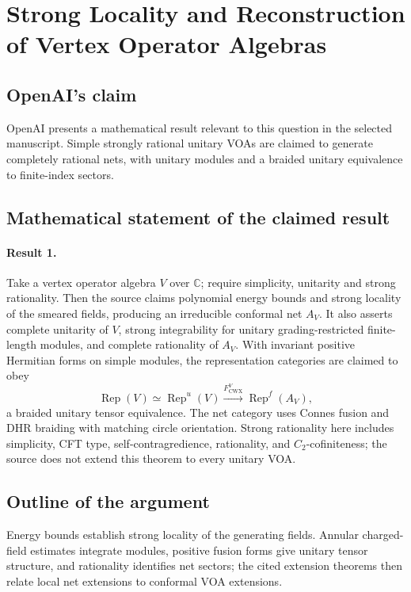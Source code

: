 \documentclass[11pt]{article}
\begin{document}
\section*{Strong Locality and Reconstruction of Vertex Operator Algebras}

\subsection{OpenAI's claim}
OpenAI presents a mathematical result relevant to this question in the selected manuscript. Simple strongly rational unitary VOAs are claimed to generate completely rational nets, with unitary modules and a braided unitary equivalence to finite-index sectors.

\subsection{Mathematical statement of the claimed result}
\paragraph{Result 1.} Take a vertex operator algebra \(V\) over \(\mathbb C\); require simplicity, unitarity and strong rationality. Then the source claims polynomial energy bounds and strong locality of the smeared fields, producing an irreducible conformal net \(A_V\). It also asserts complete unitarity of \(V\), strong integrability for unitary grading-restricted finite-length modules, and complete rationality of \(A_V\). With invariant positive Hermitian forms on simple modules, the representation categories are claimed to obey
\[
 \operatorname{Rep}(V)\simeq\operatorname{Rep}^{u}(V)
 \xrightarrow{F_{\mathrm{CWX}}^{V}}\operatorname{Rep}^{f}(A_V),
\]
a braided unitary tensor equivalence. The net category uses Connes fusion and DHR braiding with matching circle orientation. Strong rationality here includes simplicity, CFT type, self-contragredience, rationality, and \(C_2\)-cofiniteness; the source does not extend this theorem to every unitary VOA.

\subsection{Outline of the argument}
Energy bounds establish strong locality of the generating fields. Annular charged-field estimates integrate modules, positive fusion forms give unitary tensor structure, and rationality identifies net sectors; the cited extension theorems then relate local net extensions to conformal VOA extensions.
\end{document}
